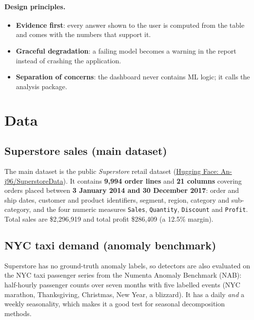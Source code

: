 \documentclass[11pt,a4paper]{article}
\newcommand{\code}[1]{\texttt{#1}}
\begin{document}
\paragraph{Design principles.}
\begin{itemize}
  \item \textbf{Evidence first}: every answer shown to the user is computed from the table and comes with the
        numbers that support it.
  \item \textbf{Graceful degradation}: a failing model becomes a warning in the report instead of crashing the
        application.
  \item \textbf{Separation of concerns}: the dashboard never contains ML logic; it calls the analysis package.
\end{itemize}

\section{Data}

\subsection{Superstore sales (main dataset)}
The main dataset is the public \emph{Superstore} retail dataset
(\href{https://huggingface.co/datasets/An-j96/SuperstoreData}{Hugging Face: An-j96/SuperstoreData}).
It contains \textbf{9{,}994 order lines} and \textbf{21 columns} covering orders placed between
\textbf{3 January 2014 and 30 December 2017}: order and ship dates, customer and product identifiers,
segment, region, category and sub-category, and the four numeric measures \code{Sales}, \code{Quantity},
\code{Discount} and \code{Profit}. Total sales are \$2{,}296{,}919 and total profit \$286{,}409
(a 12.5\% margin).

\subsection{NYC taxi demand (anomaly benchmark)}
Superstore has no ground-truth anomaly labels, so detectors are also evaluated on the NYC taxi passenger series
from the Numenta Anomaly Benchmark (NAB): half-hourly passenger counts over seven months with five labelled
events (NYC marathon, Thanksgiving, Christmas, New Year, a blizzard). It has a daily \emph{and} a weekly
seasonality, which makes it a good test for seasonal decomposition methods.
\end{document}
